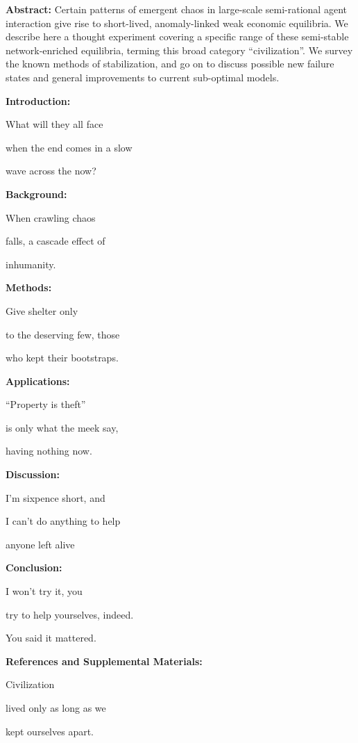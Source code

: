 \textbf{Abstract:} Certain patterns of emergent chaos in large-scale
semi-rational agent interaction give rise to short-lived, anomaly-linked
weak economic equilibria. We describe here a thought experiment covering
a specific range of these semi-stable network-enriched equilibria,
terming this broad category ``civilization''. We survey the known
methods of stabilization, and go on to discuss possible new failure
states and general improvements to current sub-optimal models.

\textbf{Introduction:}

What will they all face

when the end comes in a slow

wave across the now?

\textbf{Background:}

When crawling chaos

falls, a cascade effect of

inhumanity.

\textbf{Methods:}

Give shelter only

to the deserving few, those

who kept their bootstraps.

\textbf{Applications:}

``Property is theft''

is only what the meek say,

having nothing now.

\textbf{Discussion:}

I'm sixpence short, and

I can't do anything to help

anyone left alive

\textbf{Conclusion:}

I won't try it, you

try to help yourselves, indeed.

You said it mattered.

\textbf{References and Supplemental Materials:}

Civilization

lived only as long as we

kept ourselves apart.
